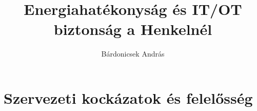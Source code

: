 \documentclass[fleqn,11pt]{olplainarticle}
\title{Energiahatékonyság és IT/OT biztonság a Henkelnél}
\author[1]{Bárdonicsek András}
\affil[1]{Mérnökinformatikus MsC, WK1OWX}
\begin{document}
\flushbottom
\maketitle
\thispagestyle{empty}



\thispagestyle{plain}



\section{Szervezeti kockázatok és felelősség}
\printbibliography
\end{document}
